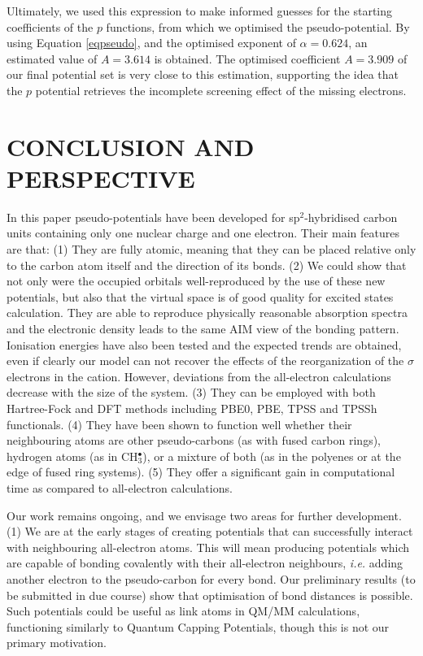 \documentclass[12pt]{article}
\begin{document}
Ultimately, we used this expression to make informed guesses for the starting coefficients of the $p$ functions, from which we optimised the pseudo-potential.
By using Equation \ref{eqpseudo}, and the optimised exponent of $\alpha=0.624$, an estimated value of $A=3.614$ is obtained.  
The optimised coefficient $A=3.909$ of our final potential set is very close to this estimation, 
supporting the idea that the $p$ potential retrieves the incomplete screening effect of the missing electrons. 

\section*{\sffamily \Large CONCLUSION AND PERSPECTIVE}

In this paper pseudo-potentials have been developed for sp$^{2}$-hybridised carbon units containing only one nuclear charge and one electron. 
Their main features are that: 
(1) They are fully atomic, meaning that they can be placed relative only to the carbon atom itself and the direction of its bonds. 
(2) We could show that not only were the occupied orbitals well-reproduced by the use of these new potentials, but also that the virtual space is of good quality for excited states calculation. 
They are able to reproduce physically reasonable absorption spectra and the electronic
density leads to the same AIM view of the bonding pattern. Ionisation energies have
also been tested and the expected trends are obtained, even if clearly our
model can not recover the effects of the reorganization of the $\sigma$ electrons
in the cation. However, deviations
from the all-electron calculations decrease with the size of the system.
(3) They can be employed with both Hartree-Fock and DFT methods including PBE0, PBE, TPSS and TPSSh functionals. 
(4) They have been shown to function well whether their neighbouring atoms are other pseudo-carbons (as with fused carbon rings), hydrogen atoms (as in CH\(^{\bullet}_{3}\)),
or a mixture of both (as in the polyenes or at the edge of fused ring systems). 
(5) They offer a significant gain in computational time as compared to all-electron calculations.

Our work remains ongoing, and we envisage two areas for further development.
(1) We are at the early stages of creating potentials that can successfully interact with neighbouring all-electron atoms.
This will mean producing potentials which are capable of bonding covalently with their all-electron neighbours, \textsl{i.e.} adding another electron to the pseudo-carbon for every bond.
Our preliminary results (to be submitted in due course) show that optimisation of bond distances is possible.
Such potentials could be useful as link atoms in QM/MM calculations, functioning similarly to Quantum Capping Potentials,\cite{dilabio_simple_2002} though this is not our primary motivation.
\end{document}
